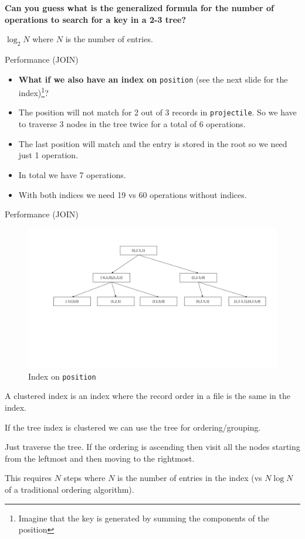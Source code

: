 \documentclass{beamer}
\begin{document}
\begin{slide}{
\item \textbf{Can you guess what is the generalized formula for the number of operations to search for a key in a 2-3 tree?}
\pause
\item $\log_{2} N$ where $N$ is the number of entries.
}\end{slide}



\begin{frame}{Performance (JOIN)}
\begin{itemize}
\item \textbf{What if we also have an index on} \texttt{position} (see the next slide for the index)\footnote{Imagine that the key is generated by summing the components of the position}?
\pause
\item The position will not match for 2 out of 3 records in \texttt{projectile}. So we have to traverse 3 nodes in the tree twice for a total of 6 operations.
\item The last position will match and the entry is stored in the root so we need just 1 operation.
\item In total we have 7 operations.
\item With both indices we need 19 vs 60 operations without indices.
\end{itemize}
\end{frame}

\begin{frame}{Performance (JOIN)}
\begin{figure}
\centering
\includegraphics[scale=0.3]{img/tree3}
\caption{Index on \texttt{position}}
\end{figure}
\end{frame}

\begin{slide}{
\item A clustered index is an index where the record order in a file is the same in the index.
\item If the tree index is clustered we can use the tree for ordering/grouping.
\item Just traverse the tree. If the ordering is ascending then visit all the nodes starting from the leftmost and then moving to the rightmost.
\item This requires $N$ steps where $N$ is the number of entries in the index (vs $N \log N$ of a traditional ordering algorithm).
}\end{slide}
\end{document}
